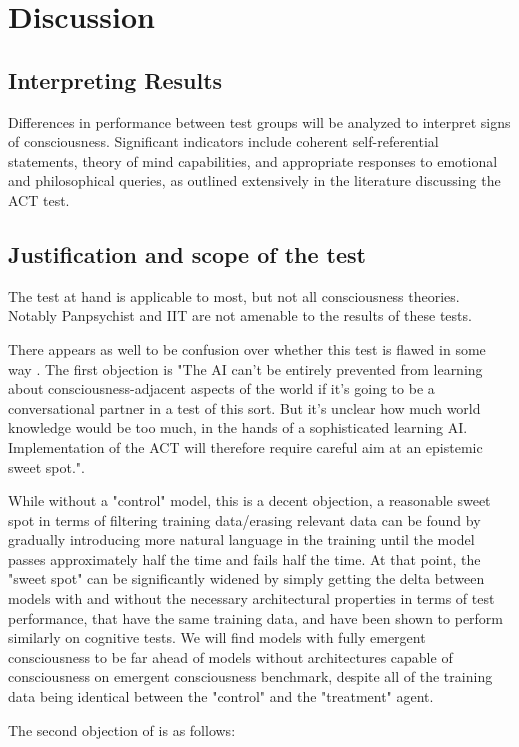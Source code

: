 \documentclass{article}
\begin{document}
\section{Discussion}
\subsection{Interpreting Results}
Differences in performance between test groups will be analyzed to interpret signs of consciousness. Significant indicators include coherent self-referential statements, theory of mind capabilities, and appropriate responses to emotional and philosophical queries, as outlined extensively in the literature discussing the ACT test.
\subsection{Justification and scope of the test}
The test at hand is applicable to most, but not all consciousness theories. Notably Panpsychist and IIT are not amenable to the results of these tests.

There appears as well to be confusion over whether this test is flawed in some way \citep{udell2021schneider}. The first objection is "The AI can’t be entirely prevented from learning about consciousness-adjacent aspects of the world if it’s going to be a conversational partner in a test of this sort. But it’s unclear how much world knowledge would be too much, in the hands of a sophisticated learning AI. Implementation of the ACT will therefore require careful aim at an epistemic sweet spot.".

While without a "control" model, this is a decent objection, a reasonable sweet spot in terms of filtering training data/erasing relevant data can be found by gradually introducing more natural language in the training until the model passes approximately half the time and fails half the time. At that point, the "sweet spot" can be significantly widened by simply getting the delta between models with and without the necessary architectural properties in terms of test performance, that have the same training data, and have been shown to perform similarly on cognitive tests. We will find models with fully emergent consciousness to be far ahead of models without architectures capable of consciousness on emergent consciousness benchmark, despite all of the training data being identical between the "control" and the "treatment" agent.

The second objection of \citep{udell2021schneider} is as follows:
\end{document}
